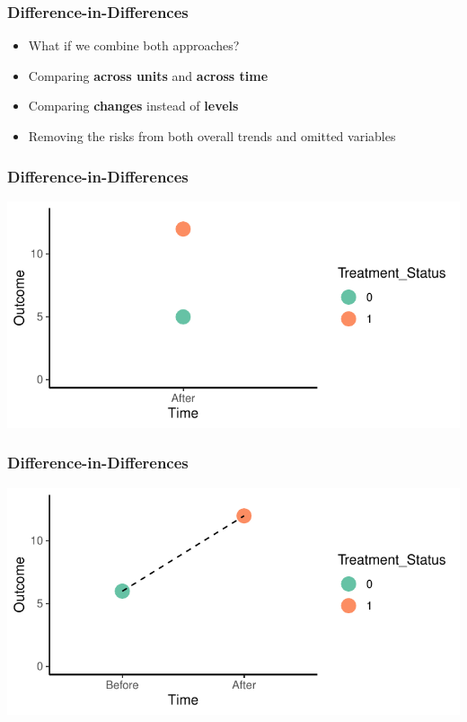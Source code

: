 \documentclass[xcolor=x11names,compress]{beamer}\usepackage[]{graphicx}\usepackage[]{color}
\makeatletter
\def\maxwidth{ %
  \ifdim\Gin@nat@width>\linewidth
    \linewidth
  \else
    \Gin@nat@width
  \fi
}
\newenvironment{knitrout}{}{} %
\renewcommand{\(}{\begin{columns}}
\renewcommand{\)}{\end{columns}}
\newcommand{\<}[1]{\begin{column}{#1}}
\renewcommand{\>}{\end{column}}
\makeatother
\begin{document}
\begin{frame}
\frametitle{Difference-in-Differences}
\begin{itemize}
\item What if we combine both approaches?
\pause
\item Comparing \textbf{across units} and \textbf{across time}
\pause
\item Comparing \textbf{changes} instead of \textbf{levels}
\pause
\item Removing the risks from both overall trends and omitted variables
\end{itemize}
\end{frame}

\begin{frame}
\frametitle{Difference-in-Differences}
\begin{knitrout}
\color{fgcolor}
\includegraphics[width=\maxwidth]{figure/DinD_chart_points_a-1} 

\end{knitrout}
\end{frame}

\begin{frame}
\frametitle{Difference-in-Differences}
\begin{knitrout}
\color{fgcolor}
\includegraphics[width=\maxwidth]{figure/DinD_chart_points_b-1} 

\end{knitrout}
\end{frame}
\end{document}

